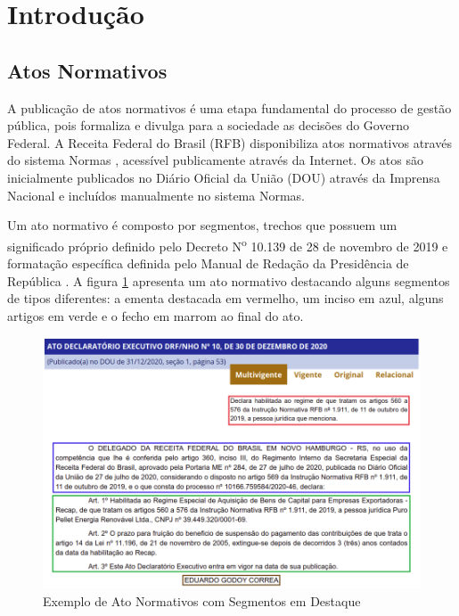 \section{Introdução}

\subsection{Atos Normativos}

A publicação de atos normativos é uma etapa fundamental do processo de gestão pública, pois formaliza e divulga para a sociedade as decisões do Governo Federal. A Receita Federal do Brasil (RFB) disponibiliza atos normativos através do sistema Normas \cite{Normas2021}, acessível publicamente através da Internet. Os atos são inicialmente publicados no Diário Oficial da União (DOU) através da Imprensa Nacional \cite{ImprensaNacional2021} e incluídos manualmente no sistema Normas.

Um ato normativo é composto por segmentos, trechos que possuem um significado próprio definido pelo Decreto N\textsuperscript{o} 10.139 de 28 de novembro de 2019 \cite{Decreto10139} e formatação específica definida pelo Manual de Redação da Presidência de República \cite{ManualRedacao2018}. A figura \ref{fig:segmentos} apresenta um ato normativo destacando alguns segmentos de tipos diferentes: a ementa destacada em vermelho, um inciso em azul, alguns artigos em verde e o fecho em marrom ao final do ato. 

\begin{figure}[h]
	\caption{Exemplo de Ato Normativos com Segmentos em Destaque}
	\center
	\label{fig:segmentos}
	\includegraphics[scale=1.9]{introducao/segmentos.png}
\end{figure}

